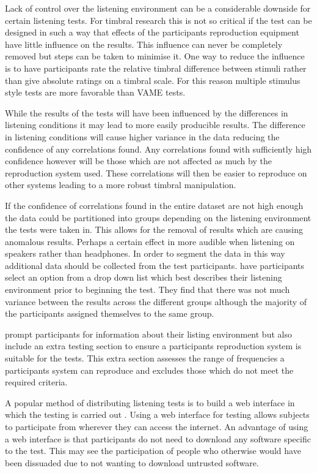			Lack of control over the listening environment can be a considerable downside for certain listening
			tests.  For timbral research this is not so critical if the test can be designed in such a way that
			effects of the participants reproduction equipment have little influence on the results. This
			influence can never be completely removed but steps can be taken to minimise it. One way to reduce
			the influence is to have participants rate the relative timbral difference between stimuli rather
			than give absolute ratings on a timbral scale. For this reason multiple stimulus style tests are
			more favorable than VAME tests.

			While the results of the tests will have been influenced by the differences in listening conditions
			it may lead to more easily producible results. The difference in listening conditions will cause
			higher variance in the data reducing the confidence of any correlations found. Any correlations
			found with sufficiently high confidence however will be those which are not affected as much by the
			reproduction system used. These correlations will then be easier to reproduce on other systems
			leading to a more robust timbral manipulation.

			If the confidence of correlations found in the entire dataset are not high enough the data could be
			partitioned into groups depending on the listening environment the tests were taken in. This allows
			for the removal of results which are causing anomalous results. Perhaps a certain effect in more
			audible when listening on speakers rather than headphones. In order to segment the data in this way
			additional data should be collected from the test participants.  \citet{wilmering2013audio} have
			participants select an option from a drop down list which best describes their listening
			environment prior to beginning the test.  They find that there was not much variance between the
			results across the different groups although the majority of the participants assigned themselves
			to the same group.

			\citet{seetharaman2014crowdsourcing} prompt participants for information about their listing
			environment but also include an extra testing section to ensure a participants reproduction system
			is suitable for the tests. This extra section assesses the range of frequencies a participants
			system can reproduce and excludes those which do not meet the required criteria.
			
			A popular method of distributing listening tests is to build a web interface in which the testing
			is carried out \citep{wilmering2013audio, cartwright2013socialeq, seetharaman2014crowdsourcing}.
			Using a web interface for testing allows subjects to participate from wherever they can access the
			internet. An advantage of using a web interface is that participants do not need to download any
			software specific to the test.  This may see the participation of people who otherwise would have
			been dissuaded due to not wanting to download untrusted software.

